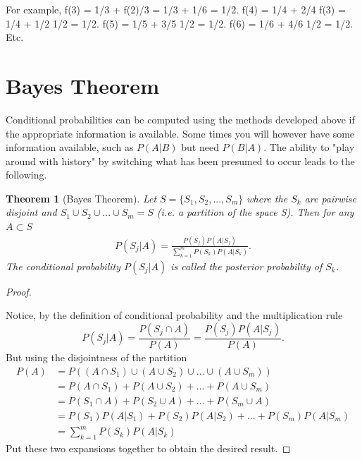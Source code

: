 \documentclass[10pt,]{book}
\theoremstyle{plain}
\newtheorem{theorem}{Theorem}[section]
\theoremstyle{definition}
\theoremstyle{definition}
\theoremstyle{definition}
\numberwithin{equation}{section}
\begin{document}
	For example,
	f(3) = 1/3 + f(2)/3 = 1/3 + 1/6 = 1/2.   
	f(4) = 1/4 + 2/4 f(3) = 1/4 + 1/2 1/2 = 1/2.
	f(5) = 1/5 + 3/5 1/2 = 1/2.
	f(6) = 1/6 + 4/6 1/2 = 1/2. Etc.
	

\typeout{************************************************}
\typeout{************************************************}
\section[{Bayes Theorem}]{Bayes Theorem}\label{section-21}
\typeout{************************************************}
\typeout{************************************************}
Conditional probabilities can be computed using the methods developed above if the appropriate information is available. Some times you will however have some information available, such as \(P(A | B)\) but need \(P(B | A)\). The ability to "play around with history" by switching what has been presumed to occur leads to the following.
\begin{theorem}[{Bayes Theorem}]\label{theorem-19}
Let \(S = \{ S_1, S_2, ... , S_m \}\) where the \(S_k\) are pairwise disjoint and \(S_1 \cup S_2 \cup ... \cup S_m = S\) (i.e. a partition of the space S).  Then for any \(A \subset S\)\begin{gather*}
P(S_j | A) = \frac{P(S_j)P(A | S_j)}{\sum_{k=1}^m P(S_k)P(A | S_k)}.
\end{gather*}
		The conditional probability \(P(S_j | A)\) is called the posterior probability of \(S_k\).
		\end{theorem}
\begin{proof}\hypertarget{proof-18}{}

		Notice, by the definition of conditional probability and the multiplication rule
		\begin{equation*}P(S_j | A) = \frac{P(S_j \cap A)}{P(A)} = \frac{P(S_j)P( A | S_j)}{P(A)}.\end{equation*}
		But using the disjointness of the partition 
		\begin{align*}
P(A) & = P( (A \cap S_1) \cup (A \cup S_2) \cup ... \cup (A \cup S_m) )\\
    & = P(A \cap S_1) + P(A \cup S_2) + ... + P(A \cup S_m)\\
    & = P(S_1 \cap A) + P(S_2 \cup A) + ... + P(S_m \cup A)\\
    & = P(S_1) P(A | S_1) + P(S_2)P(A | S_2) + ... + P(S_m)P(A | S_m)\\
    & = \sum_{k=1}^m P(S_k)P(A | S_k)
\end{align*}
		Put these two expansions together to obtain the desired result.
\end{proof}
\end{document}
